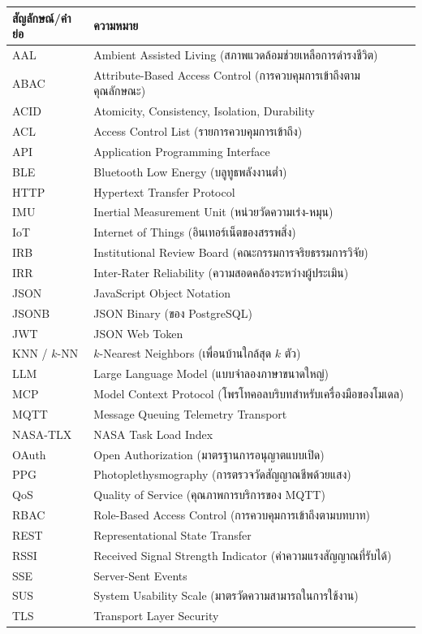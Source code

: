 \begingroup
\renewcommand{\arraystretch}{1.2}
\footnotesize

\noindent
\begin{tabular}{|p{2.8cm}|p{10.8cm}|}
\hline
\textbf{สัญลักษณ์/คำย่อ} & \textbf{ความหมาย} \\
\hline
AAL & Ambient Assisted Living (สภาพแวดล้อมช่วยเหลือการดำรงชีวิต) \\
\hline
ABAC & Attribute-Based Access Control (การควบคุมการเข้าถึงตามคุณลักษณะ) \\
\hline
ACID & Atomicity, Consistency, Isolation, Durability \\
\hline
ACL & Access Control List (รายการควบคุมการเข้าถึง) \\
\hline
API & Application Programming Interface \\
\hline
BLE & Bluetooth Low Energy (บลูทูธพลังงานต่ำ) \\
\hline
HTTP & Hypertext Transfer Protocol \\
\hline
IMU & Inertial Measurement Unit (หน่วยวัดความเร่ง-หมุน) \\
\hline
IoT & Internet of Things (อินเทอร์เน็ตของสรรพสิ่ง) \\
\hline
IRB & Institutional Review Board (คณะกรรมการจริยธรรมการวิจัย) \\
\hline
IRR & Inter-Rater Reliability (ความสอดคล้องระหว่างผู้ประเมิน) \\
\hline
JSON & JavaScript Object Notation \\
\hline
JSONB & JSON Binary (ของ PostgreSQL) \\
\hline
JWT & JSON Web Token \\
\hline
KNN / $k$-NN & $k$-Nearest Neighbors (เพื่อนบ้านใกล้สุด $k$ ตัว) \\
\hline
LLM & Large Language Model (แบบจำลองภาษาขนาดใหญ่) \\
\hline
MCP & Model Context Protocol (โพรโทคอลบริบทสำหรับเครื่องมือของโมเดล) \\
\hline
MQTT & Message Queuing Telemetry Transport \\
\hline
NASA-TLX & NASA Task Load Index \\
\hline
OAuth & Open Authorization (มาตรฐานการอนุญาตแบบเปิด) \\
\hline
PPG & Photoplethysmography (การตรวจวัดสัญญาณชีพด้วยแสง) \\
\hline
QoS & Quality of Service (คุณภาพการบริการของ MQTT) \\
\hline
RBAC & Role-Based Access Control (การควบคุมการเข้าถึงตามบทบาท) \\
\hline
REST & Representational State Transfer \\
\hline
RSSI & Received Signal Strength Indicator (ค่าความแรงสัญญาณที่รับได้) \\
\hline
SSE & Server-Sent Events \\
\hline
SUS & System Usability Scale (มาตรวัดความสามารถในการใช้งาน) \\
\hline
TLS & Transport Layer Security \\
\hline
\end{tabular}
\endgroup
